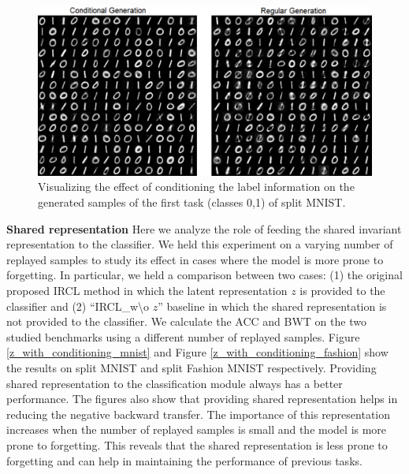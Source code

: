 \documentclass[letterpaper]{article} %
\begin{document}
\begin{figure}[ht]
\centering
\includegraphics[width=\columnwidth]{pic/generation_conditional_regular.pdf}
\caption{Visualizing the effect of conditioning the label information on the generated samples of the first task (classes 0,1) of split MNIST.}
\label{samples_with_without_condition}
\end{figure}

\textbf{Shared representation} Here we analyze the role of feeding the shared invariant representation to the classifier. We held this experiment on a varying number of replayed samples to study its effect in cases where the model is more prone to forgetting. In particular, we held a comparison between two cases: (1) the original proposed IRCL method in which the latent representation $z$ is provided to the classifier and (2) \enquote{IRCL\_w\textbackslash o $z$} baseline in which the shared representation is not provided to the classifier. We calculate the ACC and BWT on the two studied benchmarks using a different number of replayed samples. Figure \ref{z_with_conditioning_mnist} and Figure \ref{z_with_conditioning_fashion} show the results on split MNIST and split Fashion MNIST respectively. Providing shared representation to the classification module always has a better performance. The figures also show that providing shared representation helps in reducing the negative backward transfer. The importance of this representation increases when the number of replayed samples is small and the model is more prone to forgetting. This reveals that the shared representation is less prone to forgetting and can help in maintaining the performance of previous tasks.
\end{document}
